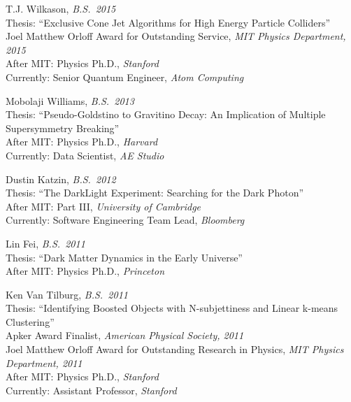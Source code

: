 \item T.J. Wilkason, \emph{B.S.~2015}
\\ Thesis: ``Exclusive Cone Jet Algorithms for High Energy Particle Colliders''
\\ Joel Matthew Orloff Award for Outstanding Service, \emph{MIT Physics Department, 2015}
\\ After MIT: Physics Ph.D., \emph{Stanford}
\\ Currently: Senior Quantum Engineer, \emph{Atom Computing}

\item Mobolaji Williams, \emph{B.S.~2013}
\\ Thesis: ``Pseudo-Goldstino to Gravitino Decay: An Implication of Multiple Supersymmetry Breaking''
\\ After MIT: Physics Ph.D., \emph{Harvard}
\\ Currently: Data Scientist, \emph{AE Studio}

\item Dustin Katzin, \emph{B.S.~2012}
\\ Thesis: ``The DarkLight Experiment: Searching for the Dark Photon''
\\ After MIT: Part III, \emph{University of Cambridge}
\\ Currently: Software Engineering Team Lead, \emph{Bloomberg}

\item Lin Fei, \emph{B.S.~2011}
\\ Thesis: ``Dark Matter Dynamics in the Early Universe''
\\ After MIT: Physics Ph.D., \emph{Princeton}

\item Ken Van Tilburg, \emph{B.S.~2011}
\\ Thesis: ``Identifying Boosted Objects with N-subjettiness and Linear k-means Clustering''
\\ Apker Award Finalist, \emph{American Physical Society, 2011}
\\ Joel Matthew Orloff Award for Outstanding Research in Physics, \emph{MIT Physics Department, 2011}
\\ After MIT: Physics Ph.D., \emph{Stanford}
\\ Currently: Assistant Professor, \emph{Stanford}

\el
